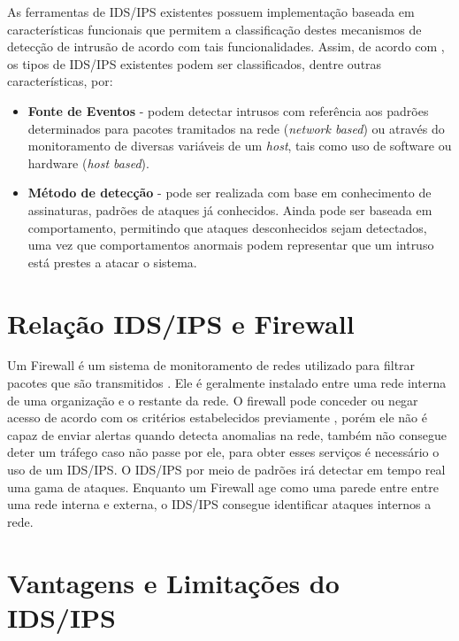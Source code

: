 	As ferramentas de IDS/IPS existentes possuem implementação baseada em características funcionais que permitem a classificação destes mecanismos de detecção de intrusão de acordo com tais funcionalidades. Assim, de acordo com \cite{Morais}, os tipos de IDS/IPS existentes podem ser classificados, dentre outras características, por:
		\begin{itemize}
			\item \textbf{Fonte de Eventos} - podem detectar intrusos com referência aos padrões determinados para pacotes tramitados na rede (\textit{network based}) ou através do monitoramento de diversas variáveis de um \textit{host}, tais como uso de software ou hardware (\textit{host based}).
	
			\item \textbf{Método de detecção} - pode ser realizada com base em conhecimento de assinaturas, padrões de ataques já conhecidos. Ainda pode ser baseada em comportamento, permitindo que ataques desconhecidos sejam detectados, uma vez que comportamentos anormais podem representar que um intruso está prestes a atacar o sistema.	
		\end{itemize}

	\section{Relação IDS/IPS e Firewall}
	\label{sec:IDS_Firewall}

	Um Firewall é um sistema de monitoramento de redes utilizado para filtrar pacotes que são transmitidos . Ele é geralmente instalado entre uma rede interna de uma organização e o restante da rede. O firewall pode conceder ou negar acesso de acordo com os critérios estabelecidos previamente \cite{Morais}, porém ele não é capaz de enviar alertas quando detecta anomalias na rede, também não consegue deter um tráfego caso não passe por ele, para obter esses serviços é necessário o uso de um IDS/IPS. O IDS/IPS por meio de padrões irá detectar em tempo real uma gama de ataques. Enquanto um Firewall age como uma parede entre entre uma rede interna e externa, o IDS/IPS consegue identificar ataques internos a rede.

	\section{Vantagens e Limitações do IDS/IPS}
	\label{sec:IDS_VeL}


